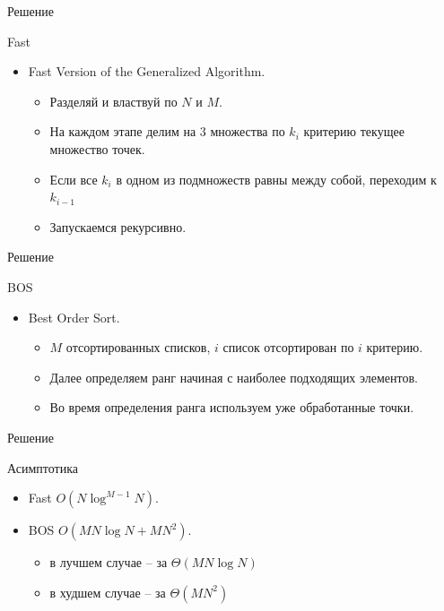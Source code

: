 \documentclass{beamer}
\begin{document}
\begin{frame}{Решение}
\begin{block}{Fast}
\begin{center}
\end{center}
\begin{itemize}
\item Fast Version of the Generalized Algorithm.
\begin{itemize}
\item Разделяй и властвуй по $N$ и $M$. 
\item На каждом этапе делим на 3 множества по $k_i$ критерию текущее множество точек.
\item Если все $k_i$ в одном из подмножеств равны между собой, переходим к $k_{i-1}$
\item Запускаемся рекурсивно.
\end{itemize}
\end{itemize}
\end{block}
\end{frame}

\begin{frame}{Решение}
\begin{block}{BOS}
\begin{center}
\end{center}
\begin{itemize}
\item Best Order Sort.
\begin{itemize}
\item $M$ отсортированных списков, $i$ список отсортирован по $i$ критерию. 
\item Далее определяем ранг начиная с наиболее подходящих элементов. 
\item Во время определения ранга используем уже обработанные точки.
\end{itemize}
\end{itemize}
\end{block}
\end{frame}


\begin{frame}{Решение}
\begin{block}{Асимптотика}
\begin{itemize}
\item Fast $O(N \log^{M-1}N)$.
\item BOS $O(MN \log N + MN^2)$.
\begin{itemize}
\item в лучшем случае -- за $\Theta(MN\log{N})$
\item в худшем случае -- за $\Theta(MN^2)$
\end{itemize}

\end{itemize}
\end{block}
\end{frame}
\end{document}
